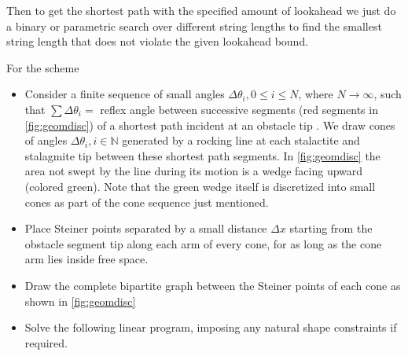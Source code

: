 Then to get the shortest path with the specified amount of lookahead we just do a binary or parametric search 
over different string lengths to find the smallest string length that does not violate the given lookahead bound. 

For the scheme 

\begin{itemize}
 \item Consider a finite sequence of small angles $\Delta \theta_i, 0 \leq i \leq N$, where $N \rightarrow \infty$,  such that 
      $\sum \Delta \theta_i =  $ reflex angle between successive segments (red segments in \autoref{fig:geomdisc}) of a shortest path incident at an 
       obstacle tip . We draw cones of angles $\Delta \theta_i, i \in \mathbb{N}$ generated by a rocking line at each stalactite and stalagmite tip 
       between these shortest path segments. In \autoref{fig:geomdisc} the area not swept by the line during its motion is a wedge facing upward (colored green).  
       Note that the green wedge itself is discretized into small cones as part of the cone sequence just mentioned. 
\item Place Steiner points separated by a small distance $\Delta x$ starting from the obstacle segment tip along each arm of every cone, for as long as the cone arm lies inside free space.
\item Draw the complete bipartite graph between the Steiner points of each cone  as shown in \autoref{fig:geomdisc}
 \item Solve the following linear program, imposing any natural shape constraints  if required.
\end{itemize}

